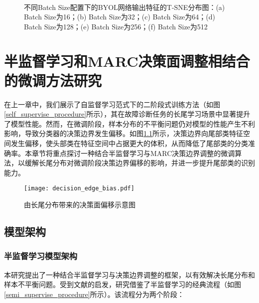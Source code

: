 \documentclass[master]{thesis-uestc}
\begin{document}
\begin{figure}
    \centering
    \\
    
    \caption{不同Batch Size配置下的BYOL网络输出特征的T-SNE分布图：(a) Batch Size为16；(b) Batch Size为32；(c) Batch Size为64；(d) Batch Size为128；(e) Batch Size为256；(f) Batch Size为512}
    \label{tsne_byol_diff_batch_size}
\end{figure}

\chapter{半监督学习和MARC决策面调整相结合的微调方法研究}
在上一章中，我们展示了自监督学习范式下的二阶段式训练方法（如图\ref{self_supervise_procedure}所示），其在故障诊断任务的长尾学习场景中显著提升了模型性能。然而，在微调阶段，样本分布的不平衡问题仍对模型的性能产生不利影响，导致分类器的决策边界发生偏移。如图\ref{decision_edge_bias}所示，决策边界向尾部类特征空间发生偏移，使头部类在特征空间中占据更大的体积，从而降低了尾部类的分类准确率。本章节将重点探讨一种结合半监督学习与MARC决策边界调整的微调算法，以缓解长尾分布对微调阶段决策边界偏移的影响，并进一步提升尾部类的识别能力。

\begin{figure}[h]
    \centering
    \texttt{[image: decision\_edge\_bias.pdf]}
    \caption{由长尾分布带来的决策面偏移示意图}
    \label{decision_edge_bias}
\end{figure}

\section{模型架构}
\subsection{半监督学习模型架构}
本研究提出了一种结合半监督学习与决策边界调整的框架，以有效解决长尾分布和样本不平衡问题。受到文献\cite{yang2020rethinking,wang2023margin}的启发，研究借鉴了半监督学习的经典流程（如图\ref{semi_supervise_procedure}所示）。该流程分为两个阶段：
\end{document}
